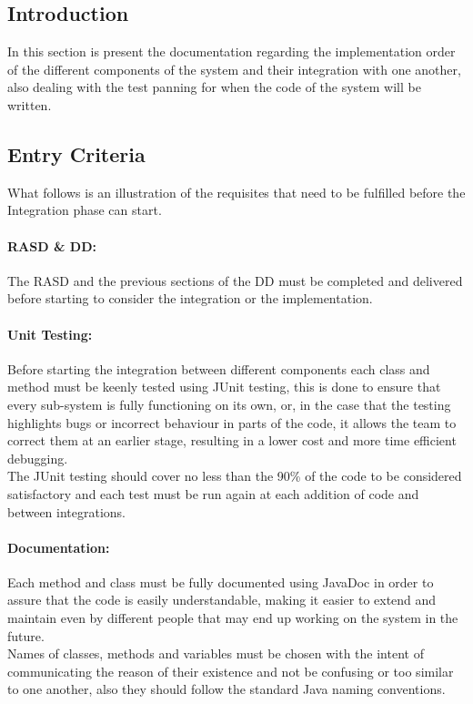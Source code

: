 \subsection{Introduction}
In this section is present the documentation regarding the implementation order of the different components of the system and their integration with one another, also dealing with the test panning for when the code of the system will be written.
\subsection{Entry Criteria}
What follows is an illustration of the requisites that need to be fulfilled before the Integration phase can start.
\paragraph*{RASD \& DD:\\} The RASD and the previous sections of the DD must be completed and delivered before starting to consider the integration or the implementation.
\paragraph*{Unit Testing:\\} Before starting the integration between different components each class and method must be keenly tested using JUnit testing, this is done to ensure that every sub-system is fully functioning on its own, or, in the case that the testing highlights bugs or incorrect behaviour in parts of the code, it allows the team to correct them at an earlier stage, resulting in a lower cost and more time efficient debugging.\\
The JUnit testing should cover no less than the 90\% of the code to be considered satisfactory and each test must be run again at each addition of code and between integrations.
\paragraph*{Documentation:\\} Each method and class must be fully documented using JavaDoc in order to assure that the code is easily understandable, making it easier to extend and maintain even by different people that may end up working on the system in the future.\\
Names of classes, methods and variables must be chosen with the intent of communicating the reason of their existence and not be confusing or too similar to one another, also they should follow the standard Java naming conventions.
\clearpage
